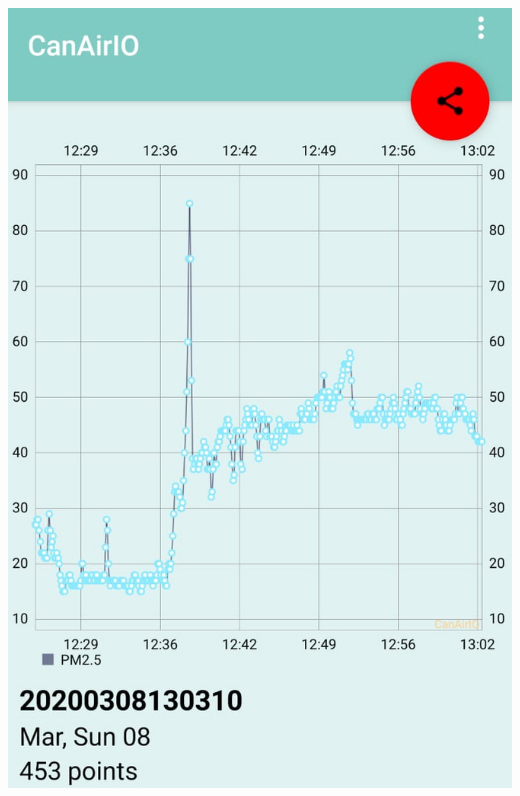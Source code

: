 \documentclass[a0paper,portrait]{baposter}
\begin{document}
\begin{poster}
{{{    	\includegraphics[scale=.15]{images/mobile_capture02_android.jpg}
    }
    {
        \hspace{-0.3cm}
        \centering
}}}
\end{poster}
\end{document}
